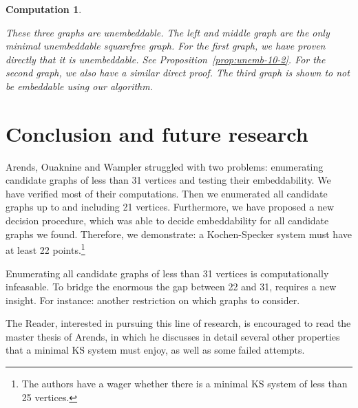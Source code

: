 \documentclass{report}
\newtheorem{comp}{Computation}[section]
\begin{document}
\begin{comp}
\begin{center}
    \end{center}
    These three graphs are unembeddable.  The left and middle graph
    are the only minimal unembeddable squarefree graph.
For the first graph, we have proven directly that it is unembeddable.
See Proposition~\ref{prop:unemb-10-2}.
For the second graph, we also have a similar direct proof. The third graph is shown to not be embeddable using our algorithm.
\end{comp}

\section{Conclusion and future research}
Arends, Ouaknine and Wampler struggled with two problems:
enumerating candidate graphs of less than 31 vertices
and testing their embeddability.
We have verified most of their computations.
Then we enumerated all candidate graphs
up to and including 21 vertices.
Furthermore, we have proposed a new decision procedure,
which was able to decide embeddability
for all candidate graphs we found.
Therefore, we demonstrate: a Kochen-Specker system must have at least
22 points.\footnote{%
The authors have a wager whether there is a minimal KS system of less
than 25 vertices.}

Enumerating all candidate graphs of less than 31 vertices
is computationally infeasable.
To bridge the enormous the gap between 22 and 31,
requires a new insight.
For instance: another restriction on which graphs to consider.

The Reader, interested in pursuing this line of research,
is encouraged to read the master thesis\cite{a09} of Arends,
in which he discusses in detail several other
properties that a minimal KS system must enjoy, as well as
some failed attempts.
\end{document}
